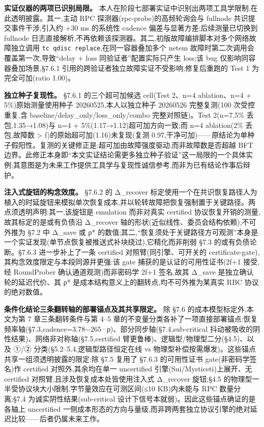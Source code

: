 \documentclass[UTF8,fontset=windows,a4paper,11pt]{ctexart}
\begin{document}
\textbf{实证仪器的两项已识别局限。}
本人在阶段七部署实证中识别出两项工具学限制,在此透明披露。其一,主动 RPC
探测器(rpc-probe)的高频轮询会与 fullnode 共识提交事件干涉,引入约 +30 ms
的系统性 cadence 偏差与显著方差;后续测量已切换到 fullnode
日志直接解析,不再依赖该探测器。其二,初版故障编排脚本对多个网络故障独立调用
\texttt{tc\ qdisc\ replace},在同一容器叠加多个 netem
故障时第二次调用会覆盖第一次,导致``delay + loss 同验证者''配置实际只产生
loss;该 bug 仅影响同容器叠加场景,§7.6.1
引用的跨验证者独立故障实证不受影响,修复后重跑的 Test 1 为完全可加(ratio
1.00)。

\textbf{独立种子复现性。} §7.6.1 的三个超可加候选 cell(Test 2、n=4
ablation、n=4 + 5\%)原始测量使用种子 20260525,本人以独立种子 20260526
完整复测(100 次受控重复,含 baseline/delay\_only/loss\_only/combo
完整对照链)。Test 2(n=7,5\% 丢包,1.35→1.08)与 n=4 +
5\%(1.17→1.12)超可加方向一致;而 n=4 ablation(2\% 丢包,故障数
\textgreater{} f)的原始超可加(1.16)未复现(复测
0.97,干净可加)------原结论为单种子假阳性。复测的关键修正是:超可加由故障强度驱动,而非故障数是否超越
BFT
边界。此修正本身即``本文实证结论需更多独立种子验证''这一局限的一个具体实例;其意图是为未来工作提供工具学与复现性诚信参考,而非为已有结论作事后辩护。

\textbf{注入式旋钮的构念效度。} §7.6.2 的 Δ\_recover
标定使用一个在共识恢复路径人为植入的时延旋钮来模拟单次恢复成本,并以轮转故障把恢复强制置于关键路径。两点须透明声明:其一,该旋钮是
emulation 而非对真实 certified 协议恢复开销的测量,故其标定的是或有负债沿
Δ\_recover 轴的形状(近似线性、委员会结构依赖),不可外推为 §7.2 中 Δ\_save
或 ρ*
的数值;其二,``恢复须处于关键路径方可观测''本身是一个实证发现(单节点恢复被推送式补块绕过),它精化而非削弱
§7.3 的或有负债论断。§7.6.3 进一步补上了一条 certified
对照臂(同引擎、可开关的
certificate-gate),其构念效度限定与本段同源并更强:该 gate
捕获的是认证的可用性证书(2f+1 接受,经 RoundProber
确认通道观测)而非密码学 2f+1 签名,故其 Δ\_save
是独立确认轮的延迟代价、其 ρ*
是成本结构意义上的翻转点,均不可外推为某真实 RBC 协议的绝对数值。

\textbf{条件化结论三条翻转轴的部署锚点及其共享限定。} 除 §7.6
的成本模型标定外,本文为第 7 章三条翻转条件与第 4--5
章的不变量分类各补了一项直接部署锚点:恢复频率轴(§7.3,cadence=3.78−265·ρ)、部分同步轴(§7.4,sub-critical
抖动被吸收的阴性结果)、网络非对称轴(§7.5,certified
臂更鲁棒)、逻辑型/物理型二分(§4.5)、以及 ①/②
分类(§5.2--5.4,逻辑型路径恒定在线 vs
物理型补偿按需爆发)。这些锚点共享一组须透明披露的限定:除 §7.5 复用了
§7.6.3 的可用性证书 gate(非密码学签名)作 certified 对照外,其余均在单一
uncertified 引擎(Sui/Mysticeti)上展开、无 certified
对照臂,且涉及恢复成本处皆使用注入式 Δ\_recover 旋钮;§4.5
的物理型一半受协议块大小限制,字节量效应在可测区间(≤10 KB)内未能与 RPC
数量分离;§7.4 为诚实阴性结果(sub-critical
设计下信号本就弱)。因此这些锚点确证的是各轴上 uncertified
一侧成本形态的方向与量级,而非跨两套独立协议引擎的绝对延迟比较------后者仍属未来工作。
\end{document}
